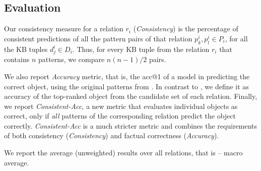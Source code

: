 
\subsection{Evaluation}
\label{sec:eval}


Our consistency measure for a relation $r_i$ (\textit{Consistency}) is the
percentage of consistent predictions of all the pattern pairs
of that relation $p_k^i,p_l^i \in P_i$, for all the KB tuples
$d_j^i \in D_i$. Thus, for every KB tuple from the relation $r_i$ that contains $n$ patterns, we compare $n(n-1)/2$ pairs.

We also report \textit{Accuracy} metric, that is, the acc@1 of a model in predicting the correct object, using the original patterns from \citet{lama}. In contrast to \citet{lama}, we define it as accuracy of the top-ranked object from the candidate set of each relation.
Finally, we report \emph{Consistent-Acc}, a new metric that evaluates individual objects as correct, only
if \emph{all} patterns of the corresponding relation predict the object
correctly. \textit{Consistent-Acc} is a much stricter metric and combines the
requirements of both consistency (\textit{Consistency}) and factual correctness (\textit{Accuracy}).


We report the average (unweighted) results over all relations, that is -- macro average.

